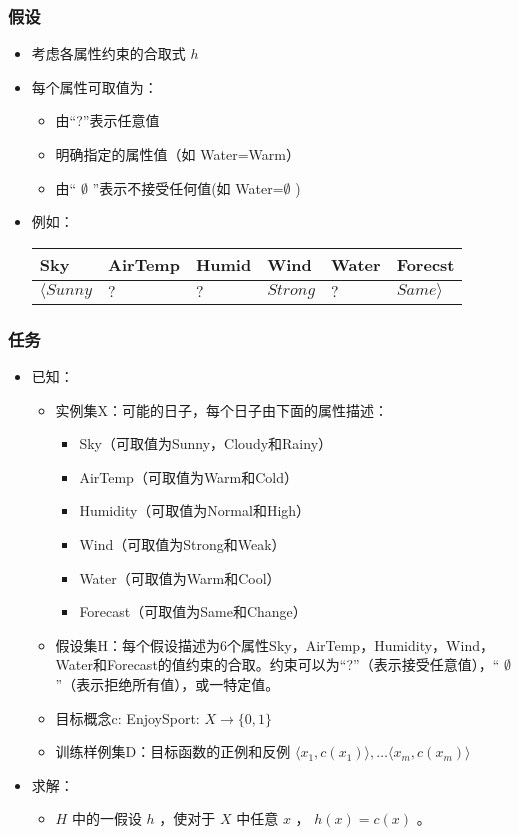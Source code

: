 \documentclass{beamer}
\begin{document}
\begin{frame}
\frametitle{假设}
\label{sec-1-3}


\begin{itemize}
\item 考虑各属性约束的合取式 $h$
\item 每个属性可取值为：
\begin{itemize}
\item 由“?”表示任意值
\item 明确指定的属性值（如 Water=Warm）
\item 由“ $\emptyset$ ”表示不接受任何值(如 Water=$\emptyset$ )
\end{itemize}
\item 例如：

\begin{center}
\begin{tabular}{llllll}
 Sky              &  AirTemp  &  Humid  &  Wind      &  Water  &  Forecst         \\
\hline
 $\langle Sunny$  &  $?$      &  $?$    &  $Strong$  &  $?$    &  $Same \rangle$  \\
\end{tabular}
\end{center}


\end{itemize}
\end{frame}
\begin{frame}
\frametitle{任务}
\label{sec-1-4}


\begin{itemize}
\item 已知：
\begin{itemize}
\item 实例集X：可能的日子，每个日子由下面的属性描述：
\begin{itemize}
\item Sky（可取值为Sunny，Cloudy和Rainy）
\item AirTemp（可取值为Warm和Cold）
\item Humidity（可取值为Normal和High）
\item Wind（可取值为Strong和Weak）
\item Water（可取值为Warm和Cool）
\item Forecast（可取值为Same和Change）
\end{itemize}
\item 假设集H：每个假设描述为6个属性Sky，AirTemp，Humidity，Wind，Water和Forecast的值约束的合取。约束可以为“?”（表示接受任意值），“ $\emptyset$ ”（表示拒绝所有值），或一特定值。
\item 目标概念c: EnjoySport:  $X\rightarrow \{0, 1\}$
\item 训练样例集D：目标函数的正例和反例  $\langle x_1, c(x_1) \rangle , \ldots \langle x_m, c(x_m) \rangle$
\end{itemize}
\item 求解：
\begin{itemize}
\item $H$ 中的一假设 $h$ ，使对于 $X$ 中任意 $x$ ， $h(x)=c(x)$ 。
\end{itemize}
\end{itemize}
\end{frame}
\end{document}
